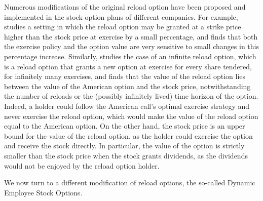     Numerous modifications of the original reload option have been proposed and implemented in the stock option plans of different companies. For example, \citet{belanger2008infinite} studies a setting in which the reload option may be granted at a strike price higher than the stock price at exercise by a small percentage, and finds that both the exercise policy and the option value are very sensitive to small changes in this percentage increase. Similarly, \citet{dybvig2003employee} studies the case of an infinite reload option, which is a reload option that grants a new option at exercise for every share tendered, for infinitely many exercises, and finds that the value of the reload option lies between the value of the American option and the stock price, notwithstanding the number of reloads or the (possibly infinitely lived) time horizon of the option. Indeed, a holder could follow the American call's optimal exercise strategy and never exercise the reload option, which would make the value of the reload option equal to the American option. On the other hand, the stock price is an upper bound for the value of the reload option, as the holder could exercise the option and receive the stock directly. In particular, the value of the option is strictly smaller than the stock price when the stock grants dividends, as the dividends would not be enjoyed by the reload option holder. 
    
    We now turn to a different modification of reload options, the so-called Dynamic Employee Stock Options.

